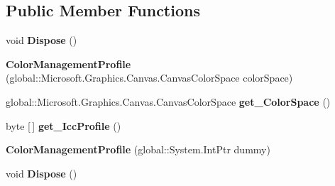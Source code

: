 \subsection*{Public Member Functions}
\begin{DoxyCompactItemize}
\item 
\mbox{\label{class_microsoft_1_1_graphics_1_1_canvas_1_1_effects_1_1_color_management_profile_afc22abc1ff5a04689728c51bb1ffeb95}} 
void {\bfseries Dispose} ()
\item 
\mbox{\label{class_microsoft_1_1_graphics_1_1_canvas_1_1_effects_1_1_color_management_profile_a173e23f67a047494990b4416994c991f}} 
{\bfseries Color\+Management\+Profile} (global\+::\+Microsoft.\+Graphics.\+Canvas.\+Canvas\+Color\+Space color\+Space)
\item 
\mbox{\label{class_microsoft_1_1_graphics_1_1_canvas_1_1_effects_1_1_color_management_profile_a58a53a5e50e93694c3fea9d140b318a1}} 
global\+::\+Microsoft.\+Graphics.\+Canvas.\+Canvas\+Color\+Space {\bfseries get\+\_\+\+Color\+Space} ()
\item 
\mbox{\label{class_microsoft_1_1_graphics_1_1_canvas_1_1_effects_1_1_color_management_profile_a6b875165a264f5db1bd62570734da15c}} 
byte \mbox{[}$\,$\mbox{]} {\bfseries get\+\_\+\+Icc\+Profile} ()
\item 
\mbox{\label{class_microsoft_1_1_graphics_1_1_canvas_1_1_effects_1_1_color_management_profile_a987399d0da3c1dfbd61121d6a15e1442}} 
{\bfseries Color\+Management\+Profile} (global\+::\+System.\+Int\+Ptr dummy)
\item 
\mbox{\label{class_microsoft_1_1_graphics_1_1_canvas_1_1_effects_1_1_color_management_profile_afc22abc1ff5a04689728c51bb1ffeb95}} 
void {\bfseries Dispose} ()
\item 
\mbox{\label{class_microsoft_1_1_graphics_1_1_canvas_1_1_effects_1_1_color_management_profile_a173e23f67a047494990b4416994c991f}} 

\end{DoxyCompactItemize}
